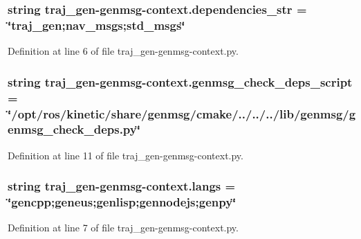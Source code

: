 \subsubsection[{\texorpdfstring{dependencies\+\_\+str}{dependencies_str}}]{\setlength{\rightskip}{0pt plus 5cm}string traj\+\_\+gen-\/genmsg-\/context.\+dependencies\+\_\+str = \char`\"{}traj\+\_\+gen;{\bf nav\+\_\+msgs};std\+\_\+msgs\char`\"{}}\hypertarget{namespacetraj__gen-genmsg-context_a417c691ecce226ef2afe434ec5853bcf}{}\label{namespacetraj__gen-genmsg-context_a417c691ecce226ef2afe434ec5853bcf}


Definition at line 6 of file traj\+\_\+gen-\/genmsg-\/context.\+py.

\subsubsection[{\texorpdfstring{genmsg\+\_\+check\+\_\+deps\+\_\+script}{genmsg_check_deps_script}}]{\setlength{\rightskip}{0pt plus 5cm}string traj\+\_\+gen-\/genmsg-\/context.\+genmsg\+\_\+check\+\_\+deps\+\_\+script = \char`\"{}/opt/ros/kinetic/share/genmsg/cmake/../../../lib/genmsg/genmsg\+\_\+check\+\_\+deps.\+py\char`\"{}}\hypertarget{namespacetraj__gen-genmsg-context_a3ed92e9c7478bb9c31ce3ba8d513b7e0}{}\label{namespacetraj__gen-genmsg-context_a3ed92e9c7478bb9c31ce3ba8d513b7e0}


Definition at line 11 of file traj\+\_\+gen-\/genmsg-\/context.\+py.

\subsubsection[{\texorpdfstring{langs}{langs}}]{\setlength{\rightskip}{0pt plus 5cm}string traj\+\_\+gen-\/genmsg-\/context.\+langs = \char`\"{}gencpp;geneus;genlisp;gennodejs;genpy\char`\"{}}\hypertarget{namespacetraj__gen-genmsg-context_aca02eb8fb1f15eb63943df387811ddd1}{}\label{namespacetraj__gen-genmsg-context_aca02eb8fb1f15eb63943df387811ddd1}


Definition at line 7 of file traj\+\_\+gen-\/genmsg-\/context.\+py.

